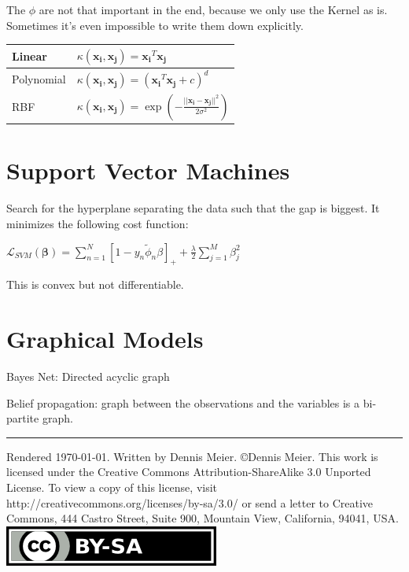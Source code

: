 \documentclass[10pt,a4paper,landscape]{article}
\begin{document}
\begin{multicols*}{4}
  The $\phi$ are not that important in the end, because we only use the Kernel as is. Sometimes it's even impossible to write them down explicitly.

  \begin{tabular}{ l | l }
    \hline
    Linear     & $\kappa(\mathbf{x_i}, \mathbf{x_j}) = \mathbf{x_i}^T \mathbf{x_j}$ \\
    \hline
    Polynomial & $\kappa(\mathbf{x_i}, \mathbf{x_j}) = (\mathbf{x_i}^T \mathbf{x_j} + c)^d$ \\
    \hline
    RBF        & $\kappa(\mathbf{x_i}, \mathbf{x_j}) = \exp\left(-\frac{||\mathbf{x_i} - \mathbf{x_j}||^2}{2\sigma^2}\right)$ \\
    \hline
  \end{tabular}

\section{Support Vector Machines}
  Search for the hyperplane separating the data such that the gap is biggest.
  It minimizes the following cost function:

  $\mathcal{L}_{SVM} (\mathbf{\beta})= \sum_{n=1}^N [1 - y_n \tilde\phi_n \beta]_{+} + \frac{\lambda}{2} \sum_{j=1}^M \beta_j^2$

  This is convex but not differentiable.

\section{Graphical Models}
  Bayes Net: Directed acyclic graph

  Belief propagation: graph between the observations and the variables is a bi-partite graph.

\hrule
\tiny
Rendered \today. Written by Dennis Meier.
\copyright Dennis Meier. This work is licensed under the Creative Commons Attribution-ShareAlike 3.0 Unported License.
To view a copy of this license, visit http://creativecommons.org/licenses/by-sa/3.0/ or
send a letter to Creative Commons, 444 Castro Street, Suite 900, Mountain View, California, 94041, USA.
\includegraphics{images/by-sa.png}

\end{multicols*}
\end{document}
